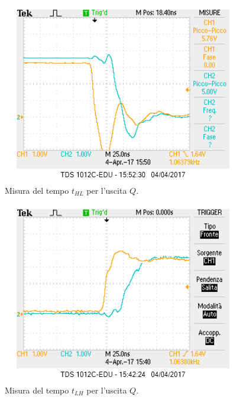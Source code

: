 \documentclass[10pt,a4paper]{article}
\begin{document}
\begin{figure}
\centering
\includegraphics[scale=1.0]{tphlQ.png}
\caption{Misura del tempo $t_{HL}$ per l'uscita $Q$.\label{q1}}
\end{figure}

\begin{figure}
\centering
\includegraphics[scale=1.0]{tplhQ.png}
\caption{Misura del tempo $t_{LH}$ per l'uscita $Q$.\label{q2}}
\end{figure}
\end{document}
